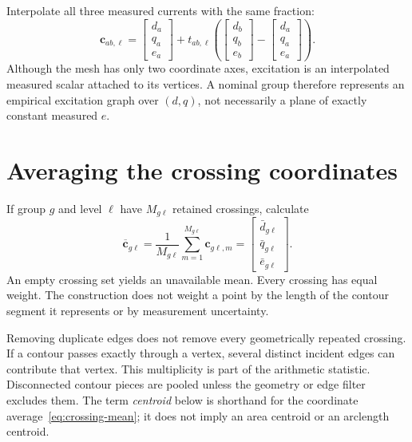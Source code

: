 Interpolate all three measured currents with the same fraction:
\begin{equation}\label{eq:intersection-current}
\bm c_{ab,\ell}=
\begin{bmatrix}d_a\\q_a\\e_a\end{bmatrix}
+t_{ab,\ell}
\left(\begin{bmatrix}d_b\\q_b\\e_b\end{bmatrix}
-\begin{bmatrix}d_a\\q_a\\e_a\end{bmatrix}\right).
\end{equation}
Although the mesh has only two coordinate axes, excitation is an interpolated measured scalar attached to its vertices. A nominal group therefore represents an empirical excitation graph over $(d,q)$, not necessarily a plane of exactly constant measured $e$.

\section{Averaging the crossing coordinates}
If group $g$ and level $\ell$ have $M_{g\ell}$ retained crossings, calculate
\begin{equation}\label{eq:crossing-mean}
\overline{\bm c}_{g\ell}
=\frac{1}{M_{g\ell}}\sum_{m=1}^{M_{g\ell}}\bm c_{g\ell,m}
=\begin{bmatrix}\bar d_{g\ell}\\\bar q_{g\ell}\\\bar e_{g\ell}\end{bmatrix}.
\end{equation}
An empty crossing set yields an unavailable mean. Every crossing has equal weight. The construction does not weight a point by the length of the contour segment it represents or by measurement uncertainty.

Removing duplicate edges does not remove every geometrically repeated crossing. If a contour passes exactly through a vertex, several distinct incident edges can contribute that vertex. This multiplicity is part of the arithmetic statistic. Disconnected contour pieces are pooled unless the geometry or edge filter excludes them. The term \emph{centroid} below is shorthand for the coordinate average~\eqref{eq:crossing-mean}; it does not imply an area centroid or an arclength centroid.

